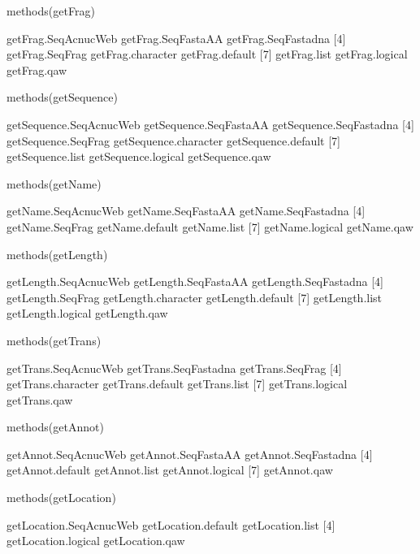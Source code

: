 \documentclass{article}
\begin{document}
\begin{Schunk}
\begin{Sinput}
 methods(getFrag)
\end{Sinput}
\begin{Soutput}
[1] getFrag.SeqAcnucWeb getFrag.SeqFastaAA  getFrag.SeqFastadna
[4] getFrag.SeqFrag     getFrag.character   getFrag.default    
[7] getFrag.list        getFrag.logical     getFrag.qaw        
\end{Soutput}
\begin{Sinput}
 methods(getSequence)
\end{Sinput}
\begin{Soutput}
[1] getSequence.SeqAcnucWeb getSequence.SeqFastaAA  getSequence.SeqFastadna
[4] getSequence.SeqFrag     getSequence.character   getSequence.default    
[7] getSequence.list        getSequence.logical     getSequence.qaw        
\end{Soutput}
\begin{Sinput}
 methods(getName)
\end{Sinput}
\begin{Soutput}
[1] getName.SeqAcnucWeb getName.SeqFastaAA  getName.SeqFastadna
[4] getName.SeqFrag     getName.default     getName.list       
[7] getName.logical     getName.qaw        
\end{Soutput}
\begin{Sinput}
 methods(getLength)
\end{Sinput}
\begin{Soutput}
[1] getLength.SeqAcnucWeb getLength.SeqFastaAA  getLength.SeqFastadna
[4] getLength.SeqFrag     getLength.character   getLength.default    
[7] getLength.list        getLength.logical     getLength.qaw        
\end{Soutput}
\begin{Sinput}
 methods(getTrans)
\end{Sinput}
\begin{Soutput}
[1] getTrans.SeqAcnucWeb getTrans.SeqFastadna getTrans.SeqFrag    
[4] getTrans.character   getTrans.default     getTrans.list       
[7] getTrans.logical     getTrans.qaw        
\end{Soutput}
\begin{Sinput}
 methods(getAnnot)
\end{Sinput}
\begin{Soutput}
[1] getAnnot.SeqAcnucWeb getAnnot.SeqFastaAA  getAnnot.SeqFastadna
[4] getAnnot.default     getAnnot.list        getAnnot.logical    
[7] getAnnot.qaw        
\end{Soutput}
\begin{Sinput}
 methods(getLocation)
\end{Sinput}
\begin{Soutput}
[1] getLocation.SeqAcnucWeb getLocation.default     getLocation.list       
[4] getLocation.logical     getLocation.qaw        
\end{Soutput}
\end{Schunk}
\end{document}
